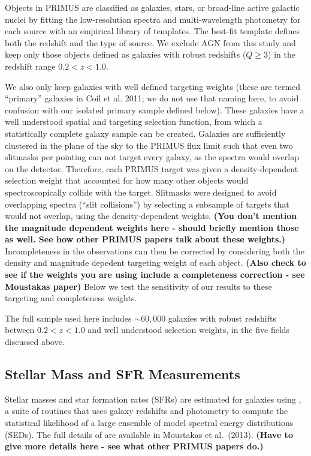 Objects in PRIMUS are classified as galaxies, stars, or broad-line active galactic nuclei by fitting the low-resolution spectra and multi-wavelength photometry for each source with an empirical library of templates.  The best-fit template defines both the redshift and the type of source.  We exclude AGN from this study and keep only those objects defined as galaxies with robust redshifts ($Q\ge 3$) in the redshift range $0.2 < z < 1.0$.

We also only keep galaxies with well defined targeting weights (these are termed ``primary'' galaxies in Coil et al. 2011; we do not use that naming here, to avoid confusion with our isolated primary sample defined below).  
These galaxies have a well understood spatial and targeting selection function, from which a statistically complete galaxy sample can be created.
Galaxies are sufficiently clustered in the plane of the sky to the PRIMUS flux limit such that even two slitmasks per pointing can not target every galaxy, as the spectra would overlap on the detector.  
Therefore, each PRIMUS target was given a density-dependent selection weight that accounted for how many other objects would spectroscopically collide with the target.
Slitmasks were designed to avoid overlapping spectra (``slit collisions'') by selecting a subsample of targets that would not overlap, using the density-dependent weights.  
{\bf(You don't mention the magnitude dependent weights here - should briefly mention those as well.  See how other PRIMUS papers talk about these weights.)}
Incompleteness in the observations can then be corrected by considering both the density and magnitude depedent targeting weight of each object.
{\bf(Also check to see if the weights you are using include a completeness correction - see Moustakas paper)}
Below we test the sensitivity of our results to these targeting and completeness weights.

The full sample used here includes ${\sim 60,000}$ galaxies with robust 
redshifts between $0.2 < z < 1.0$ and well understood selection weights, in
the five fields discussed above. 


\subsection{Stellar Mass and SFR Measurements}\label{sec:SFR}
 
Stellar masses and star formation rates (SFRs) are estimated for galaxies using \iSEDfit, a suite of routines that uses galaxy redshifts and photometry to compute the statistical likelihood of a large ensemble of model spectral energy distributions (SEDs). The full details of \iSEDfit are available in Moustakas et al.~(2013).
{\bf(Have to give more details here - see what other PRIMUS papers do.)}

